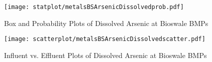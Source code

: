         \begin{figure}[hb]   %
            \centering
            \texttt{[image: statplot/metalsBSArsenicDissolvedprob.pdf]}
            \caption{Box and Probability Plots of Dissolved Arsenic at Bioswale BMPs}
        \end{figure}         %
        
        
        \begin{figure}[hb]   %
            \centering
            \texttt{[image: scatterplot/metalsBSArsenicDissolvedscatter.pdf]}
            \caption{Influent vs. Effluent Plots of Dissolved Arsenic at Bioswale BMPs}
        \end{figure}         %
        \clearpage
        